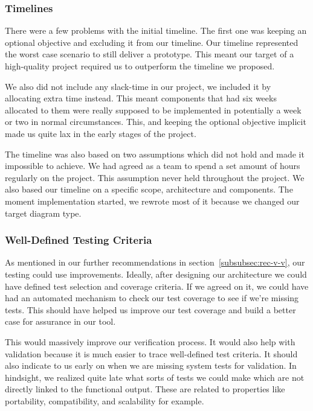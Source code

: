 \subsubsection{Timelines}
There were a few problems with the initial timeline.
The first one was keeping an optional objective and excluding it from our timeline.
Our timeline represented the worst case scenario to still deliver a prototype.
This meant our target of a high-quality project required us to outperform the timeline we proposed.

We also did not include any slack-time in our project, we included it by allocating extra time instead.
This meant components that had six weeks allocated
to them were really supposed to be implemented in potentially a week or two in normal circumstances.
This, and keeping the optional objective implicit made us quite lax in the early stages of the project.

The timeline was also based on two assumptions which did not hold and made it impossible to achieve.
We had agreed as a team to spend a set amount of hours regularly on the project.
This assumption never held throughout the project.
We also based our timeline on a specific scope, architecture and components.
The moment implementation started, we rewrote most of it because we changed our target diagram type.

\subsubsection{Well-Defined Testing Criteria}
As mentioned in our further recommendations in section~\ref{subsubsec:rec-v-v}, our testing could use improvements.
Ideally, after designing our architecture we could have defined test selection and coverage criteria.
If we agreed on it, we could have had an automated mechanism to check our test coverage to see if we're missing tests.
This should have helped us improve our test coverage and build a better case for assurance in our tool.

This would massively improve our verification process.
It would also help with validation because it is much easier to trace well-defined test criteria.
It should also indicate to us early on when we are missing system tests for validation.
In hindsight, we realized quite late what sorts of tests we could make which are not directly linked to the functional output.
These are related to properties like portability, compatibility, and scalability for example.